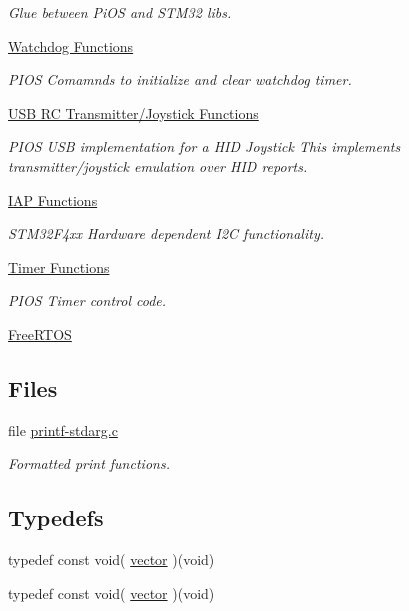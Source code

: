 \begin{DoxyCompactItemize}
\begin{DoxyCompactList}\small\item\em \-Glue between \-Pi\-O\-S and \-S\-T\-M32 libs. \end{DoxyCompactList}\item 
\hyperlink{group___p_i_o_s___w_d_g}{\-Watchdog Functions}
\begin{DoxyCompactList}\small\item\em \-P\-I\-O\-S \-Comamnds to initialize and clear watchdog timer. \end{DoxyCompactList}\item 
\hyperlink{group___p_i_o_s___u_s_b___r_c_t_x}{\-U\-S\-B R\-C Transmitter/\-Joystick Functions}
\begin{DoxyCompactList}\small\item\em \-P\-I\-O\-S \-U\-S\-B implementation for a \-H\-I\-D \-Joystick  \-This implements transmitter/joystick emulation over \-H\-I\-D reports. \end{DoxyCompactList}\item 
\hyperlink{group___p_i_o_s___i_a_p}{\-I\-A\-P Functions}
\begin{DoxyCompactList}\small\item\em \-S\-T\-M32\-F4xx \-Hardware dependent \-I2\-C functionality. \end{DoxyCompactList}\item 
\hyperlink{group___p_i_o_s___t_i_m}{\-Timer Functions}
\begin{DoxyCompactList}\small\item\em \-P\-I\-O\-S \-Timer control code. \end{DoxyCompactList}\item 
\hyperlink{group___free_r_t_o_s}{\-Free\-R\-T\-O\-S}
\end{DoxyCompactItemize}
\subsection*{\-Files}
\begin{DoxyCompactItemize}
\item 
file \hyperlink{printf-stdarg_8c}{printf-\/stdarg.\-c}
\begin{DoxyCompactList}\small\item\em \-Formatted print functions. \end{DoxyCompactList}\end{DoxyCompactItemize}
\subsection*{\-Typedefs}
\begin{DoxyCompactItemize}
\item 
typedef const void( \hyperlink{group___p_i_o_s_ga3c46a32d92954306e54f6e9acdd9eaac}{vector} )(void)
\item 
typedef const void( \hyperlink{group___p_i_o_s_ga3c46a32d92954306e54f6e9acdd9eaac}{vector} )(void)
\end{DoxyCompactItemize}
